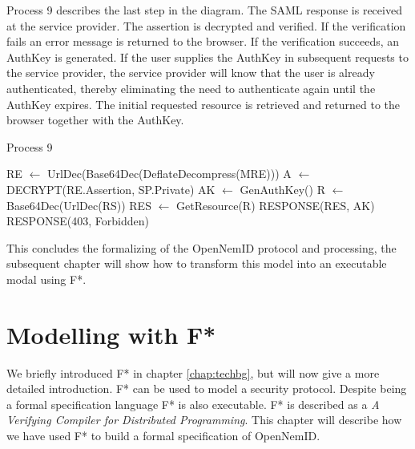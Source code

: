 \documentclass[twosided]{report}
\begin{document}
Process 9 describes the last step in the diagram. The SAML response is received at the service provider. The assertion is decrypted and verified. If the verification fails an error message is returned to the browser. If the verification succeeds, an AuthKey is generated. If the user supplies the AuthKey in subsequent requests to the service provider, the service provider will know that the user is already authenticated, thereby eliminating the need to authenticate again until the AuthKey expires. The initial requested resource is retrieved and returned to the browser together with the AuthKey.
\begin{algorithm}[H]
	\caption{Process 9}
	\begin{algorithmic}
		\STATE RE $\leftarrow$ UrlDec(Base64Dec(DeflateDecompress(MRE)))
		\STATE A $\leftarrow$ DECRYPT(RE.Assertion, SP.Private)
			\STATE AK $\leftarrow$ GenAuthKey()
			\STATE R $\leftarrow$ Base64Dec(UrlDec(RS))
			\STATE RES $\leftarrow$ GetResource(R)
			\RETURN RESPONSE(RES, AK)
		\ELSE
			\RETURN RESPONSE(403, Forbidden)
		\ENDIF
	\end{algorithmic}
\end{algorithm}

This concludes the formalizing of the OpenNemID protocol and processing, the subsequent chapter will show how to transform this model into an executable modal using F*.

\chapter{Modelling with F*}
We briefly introduced F* in chapter \ref{chap:techbg}, but will now give a more detailed introduction. F* can be used to model a security protocol. Despite being a formal specification language F* is also executable. F* is described as a \emph{A Verifying Compiler for Distributed Programming}. This chapter will describe how we have used F* to build a formal specification of OpenNemID.
\end{document}
